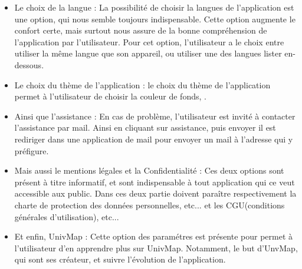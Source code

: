 \documentclass{article}
\begin{document}
\begin{itemize}
    \item Le choix de la langue : La possibilité de choisir la langues de l'application est une option, qui nous semble toujours indispensable. Cette option augmente le confort certe, mais surtout nous assure de la bonne compréhension de l'application par l'utilisateur. 
    Pour cet option, l'utilisateur a le choix entre utiliser la même langue que son appareil, ou utiliser une des langues lister en-dessous.   

    \item Le choix du thème de l'application : le choix du thème de l'application permet à l'utilisateur de choisir la couleur de fonds, .
    
    \item Ainsi que l'assistance : En cas de problème, l'utilisateur est invité à contacter l'assistance par mail. Ainsi en cliquant sur assistance, puis envoyer il est rediriger dans une application de mail pour envoyer un mail à l'adresse qui y préfigure. 
    
    \item Mais aussi le mentions légales et la Confidentialité : Ces deux options sont présent à titre informatif, et sont indispensable à tout application qui ce veut accessible aux public. Dans ces deux partie doivent paraître respectivement la charte de protection des données personnelles, etc... et les CGU(conditions générales d'utilisation), etc...
    
    \item Et enfin, UnivMap : Cette option des paramétres est présente pour permet à l'utilisateur d'en apprendre plus sur UnivMap. Notamment, le but d'UnvMap, qui sont ses créateur, et suivre l'évolution de l'application. 
    
\end{itemize}

\vspace{10pt}   %
\end{document}
